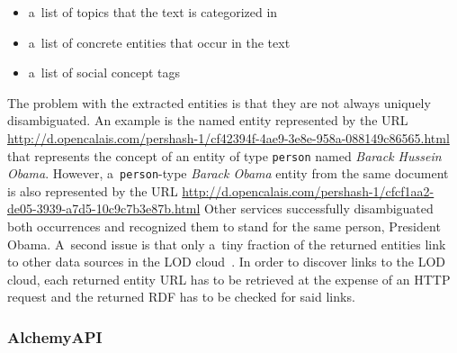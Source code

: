 \begin{itemize}
  \itemsep0em
  \item a~list of topics that the text is categorized in
  \item a~list of concrete entities that occur in the text
  \item a~list of social concept tags
\end{itemize}

The problem with the extracted entities is
that they are not always uniquely disambiguated.
An example is the named entity
represented by the URL \url{http://d.opencalais.com/pershash-1/cf42394f-4ae9-3e8e-958a-088149c86565.html}
that represents the concept of an entity of type \texttt{person}
named \emph{Barack Hussein Obama}.
However, a~\texttt{person}-type \emph{Barack Obama} entity from the same document is also represented by the URL
\url{http://d.opencalais.com/pershash-1/cfcf1aa2-de05-3939-a7d5-10c9c7b3e87b.html}
Other services successfully disambiguated both occurrences and
recognized them to stand for the same person, President Obama.
A~second issue is that only a~tiny fraction of the returned
entities link to other data sources in the
LOD cloud~\cite{bizer2011statelodcloud,cyganiak2011lodcloud}.
In order to discover links to the LOD cloud,
each returned entity URL has to be retrieved at the expense
of an HTTP request and the returned RDF has to be checked
for said links.

\subsubsection{AlchemyAPI}


